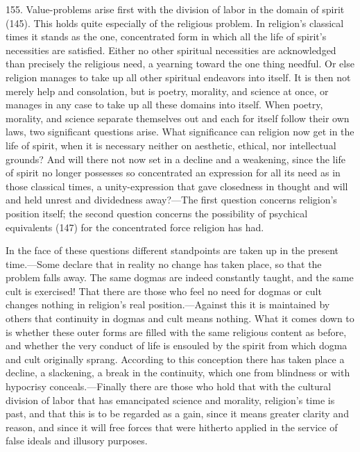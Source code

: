 \documentclass[12pt,a4paper]{book}
\newcommand{\opage}[1]{\marginnote{\footnotesize\textit{[#1]}}}
\begin{document}
155. Value-problems arise first with the division of labor in the domain of spirit (145). This
holds quite especially of the religious problem. In religion's classical times it stands as the
one, concentrated form in which all the life of spirit's necessities are satisfied. Either no
other spiritual necessities are acknowledged than precisely the \opage{370}religious need, a yearning toward
the one thing needful. Or else religion manages to take up all other spiritual endeavors into
itself. It is then not merely help and consolation, but is poetry, morality, and science at once,
or manages in any case to take up all these domains into itself. When poetry, morality, and
science separate themselves out and each for itself follow their own laws, two significant questions arise. What significance can religion now get in the life of spirit, when it is necessary neither
on aesthetic, ethical, nor intellectual grounds? And will there not now set in a decline and a
weakening, since the life of spirit no longer possesses so concentrated an expression for all its
need as in those classical times, a unity-expression that gave closedness in thought and will and
held unrest and dividedness away?---The first question concerns religion's position itself; the
second question concerns the possibility of psychical equivalents (147) for the concentrated force
religion has had.

In the face of these questions different standpoints are taken up in the present time.---Some
declare that in reality no change has taken place, so that the problem falls away. The same dogmas
are indeed constantly taught, and the same cult is exercised! That there are those who feel no need
for dogmas or cult changes nothing in religion's real position.---Against this it is maintained by
others that continuity in dogmas and cult means nothing. What it comes down to is whether these
outer forms are filled with the same religious content as before, and whether the very conduct of
life is ensouled by the spirit from which dogma and cult originally sprang. According to this
conception there has taken place a decline, a slackening, a break in the continuity, which one from
blindness or with hypocrisy conceals.---Finally there are those who hold that with the cultural
division of labor that has emancipated science and morality, religion's time is past, and that this
is to be regarded as a gain, since it means greater clarity and reason, and since it will free
forces that were hitherto applied in the service of false ideals and illusory purposes.
\end{document}
